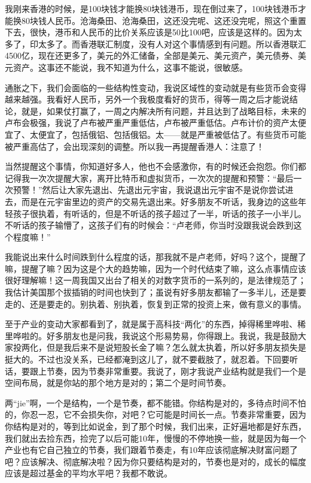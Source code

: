 \documentclass[UTF8, 12pt, a4paper]{ctexrep}
\begin{document}
我刚来香港的时候，是100块钱才能换80块钱港币，现在倒过来了，100块钱港币才能换80块钱人民币。沧海桑田、沧海桑田，这还没完呢、这还没完呢，照这个重置下去，很快，港币和人民币的比价关系应该是50比100吧，应该是这样的。因为太多了，印太多了。而香港联汇制度，没有人对这个事情感到有问题。所以香港联汇4500亿，现在还更多了，美元的外汇储备，全部是美元、美元资产，美元债券、美元资产。这事还不能说，我不知道为什么，这事不能说，很敏感。

通胀之下，我们会面临的一些结构性变动，我说区域性的变动就是有些货币会变得越来越强。我看好人民币，另外一个我极度看好的货币，得等一周之后才能说结论，就是，如果仗打赢了，一周之内解决所有问题，并且达到了战略目标，未来的卢布会极强，我说了卢布被严重严重低估，卢布被严重低估。卢布计价的资产太便宜了、太便宜了，包括俄铝、包括俄铝。太——就是严重被低估了。有些货币可能被严重高估了，会出现深刻的调整。所以我一再提醒香港人：注意了！

当然提醒这个事情，你知道好多人，他也不会感激你，有的时候还会抱怨。你们都记得我一次次提醒大家，离开比特币和虚拟货币，一次次的提醒和预警：“最后一次预警！”然后让大家先退出、先退出元宇宙，我说退出元宇宙不是说你尝试进去，而是在元宇宙里边的资产的交易先退出来。好多朋友不听话，我身边的这些年轻孩子很执着，有听话的，但是不听话的孩子超过了一半，听话的孩子一小半儿。不听话的孩子输懵了，这孩子们有的时候会：“卢老师，你当时没跟我说会跌到这个程度嘛！”

我能说出来什么时间跌到什么程度的话，那我就不是卢老师，好吗？这个，提醒了嘛，提醒了嘛？因为这是个大的趋势嘛，因为一个时代结束了嘛，这么点事情应该很好理解嘛！这一周我国又出台了相关的对数字货币的一系列的，是法律规范了；我估计美国那个拔插销的时间也快到了；虽说有好多朋友都输了一多半儿，还是要走的、还是要走的。别执着、别执着，恢复到正常的投资上来，做有意义的事情。

至于产业的变动大家都看到了，就是属于高科技“两化”的东西，掉得稀里哗啦、稀里哗啦的。好多朋友也是问我，我说这个形易势易，你得跟上。我说，我是鼓励大家投两化，但是我后来不是说短股长金了嘛？怎么就太执着，所以好多朋友损失是挺大的。不过也没关系，已经都淹到这儿了，就不要截肢了，就忍着。下回要听话，要跟上节奏，因为节奏非常重要。我说了，刚才我说产业结构就是我们一个是空间布局，就是你站的那个地方是对的；第二个是时间节奏。

两“jie”啊，一个是结构，一个是节奏，都不能错。你结构是对的，多待点时间不怕的，你忍一忍，它不会损失你，对吧？它可能是时间长一点。节奏非常重要，因为你结构是对的，等到比如说金，到了那个时候，我们出来，正好遍地都是好东西，我们就出去捡东西，捡完了以后可能10年，慢慢的不停地换一些，就是因为每一个产业也有它自己独立的节奏，我们跟着节奏走，有10年应该彻底解决财富问题了吧？应该解决、彻底解决啦？因为你只要结构是对的，节奏也是对的，成长的幅度应该是超过基金的平均水平吧？我都不敢说。
\end{document}
